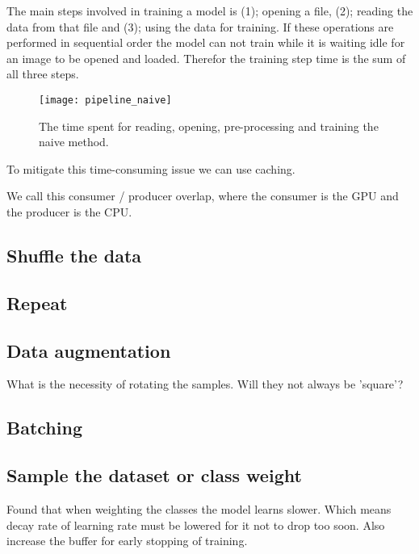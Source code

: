 \documentclass[thesis.tex]{subfiles}
\begin{document}
The main steps involved in training a model is (1); opening a file, (2); reading the data from that file and (3); using the data for training. If these operations are performed in sequential order the model can not train while it is waiting idle for an image to be opened and loaded. Therefor the training step time is the sum of all three steps. 

\begin{figure} %
  \begin{center}
    \texttt{[image: pipeline\_naive]}
    \caption[The time spent for reading, opening, pre-processing and training the naive method.]{The time spent for reading, opening, pre-processing and training the naive method.}
    \label{fig:pipeline_naive}
  \end{center}
\end{figure}

To mitigate this time-consuming issue we can use caching.


We call this consumer / producer overlap, where the consumer is the GPU and the producer is the CPU. %


\subsection{Shuffle the data}


\subsection{Repeat}


\subsection{Data augmentation}
What is the necessity of rotating the samples. Will they not always be 'square'?


\subsection{Batching}


\subsection{Sample the dataset or class weight}
Found that when weighting the classes the model learns slower. Which means decay rate of learning rate must be lowered for it not to drop too soon. Also increase the buffer for early stopping of training.
\end{document}

